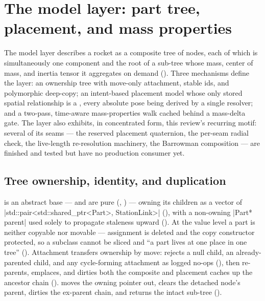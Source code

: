 \section{The model layer: part tree, placement, and mass properties}\label{sec:model}

The model layer describes a rocket as a composite tree of  nodes, each of
which is simultaneously one component and the root of a sub-tree whose mass, center of mass, and
inertia tensor it aggregates on demand (). Three mechanisms define the
layer: an ownership tree with move-only attachment, stable ids, and polymorphic deep-copy; an
intent-based placement model whose only stored spatial relationship is a , every
absolute pose being derived by a single resolver; and a two-pass, time-aware mass-properties walk
cached behind a mass-delta gate. The layer also exhibits, in concentrated form, this review's
recurring motif: several of its seams --- the reserved placement quaternion, the per-seam radial
check, the live-length re-resolution machinery, the Barrowman composition --- are finished and
tested but have no production consumer yet.

\subsection{Tree ownership, identity, and duplication}\label{sec:model-tree}

 is an abstract base ---  and  are pure
(, ) --- owning its children as a vector
of \cppinline|std::pair<std::shared_ptr<Part>, StationLink>| (),
with a non-owning \cppinline|Part* parent| used solely to propagate staleness upward
(). At the value level a part is neither copyable nor movable ---
assignment is deleted and the copy constructor protected, so a subclass cannot be sliced and ``a
part lives at one place in one tree'' (). Attachment transfers
ownership by move:  rejects a null child, an already-parented child, and any
cycle-forming attachment as logged no-ops (), then re-parents,
emplaces, and dirties both the composite and placement caches up the ancestor chain
().  moves the owning pointer out, clears the
detached node's parent, dirties the ex-parent chain, and returns the intact sub-tree
().

